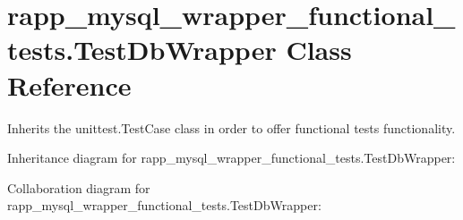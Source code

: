 \hypertarget{classrapp__mysql__wrapper__functional__tests_1_1TestDbWrapper}{\section{rapp\-\_\-mysql\-\_\-wrapper\-\_\-functional\-\_\-tests.\-Test\-Db\-Wrapper Class Reference}
\label{classrapp__mysql__wrapper__functional__tests_1_1TestDbWrapper}
}


Inherits the unittest.\-Test\-Case class in order to offer functional tests functionality.  




Inheritance diagram for rapp\-\_\-mysql\-\_\-wrapper\-\_\-functional\-\_\-tests.\-Test\-Db\-Wrapper\-:


Collaboration diagram for rapp\-\_\-mysql\-\_\-wrapper\-\_\-functional\-\_\-tests.\-Test\-Db\-Wrapper\-:
